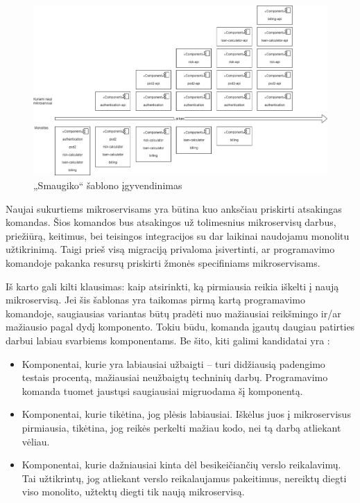 \documentclass[fleqn]{VUMIFPSkursinis}
\begin{document}
\begin{figure}[H]
    \centering
    \includegraphics{img/smaugiko-sablonas.png}
    \caption{„Smaugiko“ šablono įgyvendinimas}
    \label{img:smaugiko-sablonas}
\end{figure}

Naujai sukurtiems mikroservisams yra būtina kuo anksčiau priskirti atsakingas komandas. Šios komandos bus atsakingos už tolimesnius mikroservisų darbus, priežiūrą, keitimus, bei teisingos integracijos su dar laikinai naudojamu monolitu užtikrinimą. Taigi prieš visą migraciją privaloma įsivertinti, ar programavimo komandoje pakanka resursų priskirti žmonės specifiniams mikroservisams.


Iš karto gali kilti klausimas: kaip atsirinkti, ką pirmiausia reikia iškelti į naują mikroservisą. Jei šis šablonas yra taikomas pirmą kartą programavimo komandoje, saugiausias variantas būtų pradėti nuo mažiausiai reikšmingo ir/ar mažiausio pagal dydį komponento. Tokiu būdu, komanda įgautų daugiau patirties darbui labiau svarbiems komponentams. Be šito, kiti galimi kandidatai yra \cite{Beh18}:
\begin{itemize}
    \item Komponentai, kurie yra labiausiai užbaigti – turi didžiausią padengimo testais procentą, mažiausiai neužbaigtų techninių darbų. Programavimo komanda tuomet jaustųsi saugiausiai migruodama šį komponentą.
    \item Komponentai, kurie tikėtina, jog plėsis labiausiai. Iškėlus juos į mikroservisus pirmiausia, tikėtina, jog reikės perkelti mažiau kodo, nei tą darbą atliekant vėliau.
    \item Komponentai, kurie dažniausiai kinta dėl besikeičiančių verslo reikalavimų. Tai užtikrintų, jog atliekant verslo reikalaujamus pakeitimus, nereiktų diegti viso monolito, užtektų diegti tik naują mikroservisą.
\end{itemize}
\end{document}
